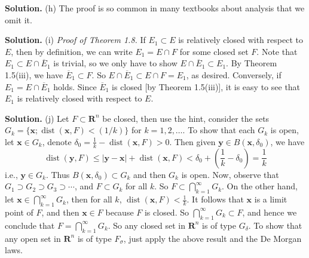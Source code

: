 \documentclass[12pt]{article}
\theoremstyle{definition}
\begin{document}
\smallskip
\noindent\textbf{Solution.}\quad
(h) The proof is so common in many textbooks about analysis that we omit it.

\smallskip
\noindent\textbf{Solution.}\quad
(i) \textit{Proof of Theorem 1.8.} If $E_1\subset E$ is relatively closed with respect to $E$, then by definition, we can write $E_1=E\cap F$ for some closed set $F$. Note that $E_1\subset E\cap\overline{E}_1$ is trivial, so we only have to show $E\cap\overline{E}_1\subset E_1$. By Theorem 1.5(iii), we have $\overline{E}_1\subset F$. So $E\cap\overline{E}_1\subset E\cap F=E_1$, as desired. Conversely, if $E_1=E\cap\overline{E}_1$ holds. Since $\overline{E}_1$ is closed [by Theorem 1.5(iii)], it is easy to see that $E_1$ is relatively closed with respect to $E$.

\smallskip
\noindent\textbf{Solution.}\quad
(j) Let $F\subset\mathbf{R}^n$ be closed, then use the hint, consider the sets $G_k=\{\mathbf{x};\operatorname{dist}(\mathbf{x},F)<(1/k)\}$ for $k=1,2,\ldots$. To show that each $G_k$ is open, let $\mathbf{x}\in G_k$, denote $\delta_0=\frac{1}{k}-\operatorname{dist}(\mathbf{x},F)>0$. Then given $\mathbf{y}\in B(\mathbf{x},\delta_0)$, we have
$$
\operatorname{dist}(\mathbf{y},F)
\le \left\vert \mathbf{y}-\mathbf{x}\right\vert+\operatorname{dist}(\mathbf{x},F)
<\delta_0+\left(\frac{1}{k}-\delta_0\right)
=\frac{1}{k}
$$
i.e., $\mathbf{y}\in G_k$. Thus $B(\mathbf{x},\delta_0)\subset G_k$ and then $G_k$ is open. Now, observe that $G_1\supset G_2\supset G_3\supset\cdots$, and $F\subset G_k$ for all $k$. So $F\subset \bigcap_{k=1}^\infty G_k$. On the other hand, let $\mathbf{x}\in\bigcap_{k=1}^\infty G_k$, then for all $k$, $\operatorname{dist}(\mathbf{x},F)<\frac{1}{k}$. It follows that $\mathbf{x}$ is a limit point of $F$, and then $\mathbf{x}\in F$ because $F$ is closed. So $\bigcap_{k=1}^\infty G_k\subset F$, and hence we conclude that $F=\bigcap_{k=1}^\infty G_k$. So any closed set in $\mathbf{R}^n$ is of type $G_\delta$. To show that any open set in $\mathbf{R}^n$ is of type $F_\sigma$, just apply the above result and the De Morgan laws.
\end{document}
